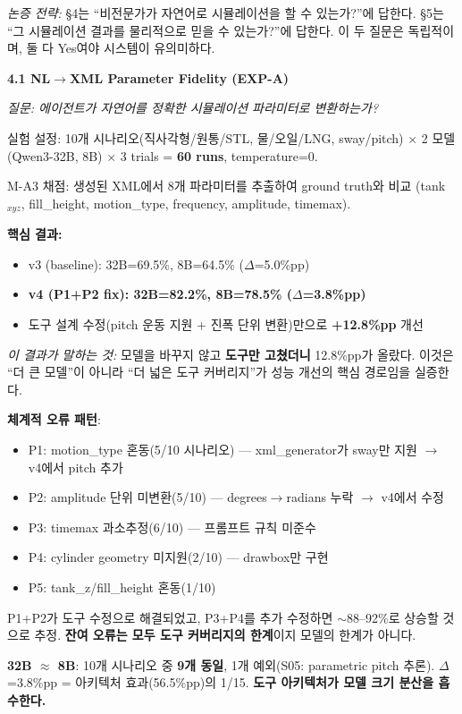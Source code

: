 \documentclass[12pt,a4paper]{article}
\begin{document}
\textit{논증 전략:} §4는 ``비전문가가 자연어로 시뮬레이션을 할 수 있는가?''에 답한다.
§5는 ``그 시뮬레이션 결과를 물리적으로 믿을 수 있는가?''에 답한다.
이 두 질문은 독립적이며, 둘 다 Yes여야 시스템이 유의미하다.

\textbf{4.1 NL$\rightarrow$XML Parameter Fidelity (EXP-A)}

\textit{질문: 에이전트가 자연어를 정확한 시뮬레이션 파라미터로 변환하는가?}

실험 설정: 10개 시나리오(직사각형/원통/STL, 물/오일/LNG, sway/pitch)
$\times$ 2 모델(Qwen3-32B, 8B) $\times$ 3 trials = \textbf{60 runs}, temperature=0.

M-A3 채점: 생성된 XML에서 8개 파라미터를 추출하여 ground truth와 비교
(tank$_{xyz}$, fill\_height, motion\_type, frequency, amplitude, timemax).

\textbf{핵심 결과:}
\begin{itemize}[nosep]
\item v3 (baseline): 32B=69.5\%, 8B=64.5\% ($\Delta$=5.0\%pp)
\item \textbf{v4 (P1+P2 fix): 32B=82.2\%, 8B=78.5\% ($\Delta$=3.8\%pp)}
\item 도구 설계 수정(pitch 운동 지원 + 진폭 단위 변환)만으로 \textbf{+12.8\%pp} 개선
\end{itemize}

\textit{이 결과가 말하는 것:}
모델을 바꾸지 않고 \textbf{도구만 고쳤더니} 12.8\%pp가 올랐다.
이것은 ``더 큰 모델''이 아니라 ``더 넓은 도구 커버리지''가
성능 개선의 핵심 경로임을 실증한다.

\textbf{체계적 오류 패턴}:
\begin{itemize}[nosep]
\item P1: motion\_type 혼동(5/10 시나리오) --- xml\_generator가 sway만 지원 $\rightarrow$ v4에서 pitch 추가
\item P2: amplitude 단위 미변환(5/10) --- degrees$\rightarrow$radians 누락 $\rightarrow$ v4에서 수정
\item P3: timemax 과소추정(6/10) --- 프롬프트 규칙 미준수
\item P4: cylinder geometry 미지원(2/10) --- drawbox만 구현
\item P5: tank\_z/fill\_height 혼동(1/10)
\end{itemize}

P1+P2가 도구 수정으로 해결되었고,
P3+P4를 추가 수정하면 $\sim$88--92\%로 상승할 것으로 추정.
\textbf{잔여 오류는 모두 도구 커버리지의 한계}이지 모델의 한계가 아니다.

\textbf{32B $\approx$ 8B}: 10개 시나리오 중 \textbf{9개 동일}, 1개 예외(S05: parametric pitch 추론).
$\Delta$=3.8\%pp = 아키텍처 효과(56.5\%pp)의 1/15.
\textbf{도구 아키텍처가 모델 크기 분산을 흡수한다.}
\end{document}

